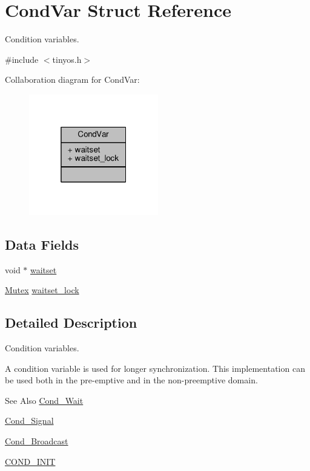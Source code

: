 \hypertarget{structCondVar}{\section{Cond\-Var Struct Reference}
\label{structCondVar}
}


Condition variables.  




{\ttfamily \#include $<$tinyos.\-h$>$}



Collaboration diagram for Cond\-Var\-:
\nopagebreak
\begin{figure}[H]
\begin{center}
\leavevmode
\includegraphics[width=160pt]{structCondVar__coll__graph}
\end{center}
\end{figure}
\subsection*{Data Fields}
\begin{DoxyCompactItemize}
\item 
void $\ast$ \hyperlink{structCondVar_a7da9e0169713c3b3ae386a8ab49f7e34}{waitset}
\item 
\hyperlink{group__syscalls_gaef2ec62cae8e0031fd19fc8b91083ade}{Mutex} \hyperlink{structCondVar_a477b855f4d3880d231206ae79bd5b6cf}{waitset\-\_\-lock}
\end{DoxyCompactItemize}


\subsection{Detailed Description}
Condition variables. 

A condition variable is used for longer synchronization. This implementation can be used both in the pre-\/emptive and in the non-\/preemptive domain.

\begin{DoxySeeAlso}{See Also}
\hyperlink{group__syscalls_ga970dca2210b3f2ec8aedab7f542a9bf4}{Cond\-\_\-\-Wait} 

\hyperlink{group__syscalls_ga43f64f8be273d2fe77d7de5f4b81e22d}{Cond\-\_\-\-Signal} 

\hyperlink{group__syscalls_ga8196aa2a48cad90742f254cc3b8fd351}{Cond\-\_\-\-Broadcast} 

\hyperlink{group__syscalls_ga6a7055a466bff255172e05f6ec82d792}{C\-O\-N\-D\-\_\-\-I\-N\-I\-T} 
\end{DoxySeeAlso}


